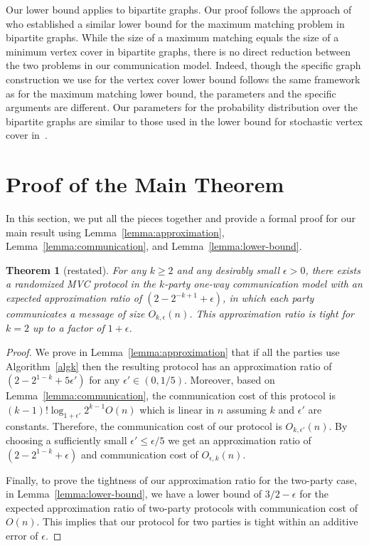 \documentclass[11pt]{article}
\newtheorem*{theorem*}{Theorem}
\begin{document}
Our lower bound
applies to bipartite graphs. Our proof follows the approach
of~\cite{DBLP:conf/soda/GoelKK12} who established a similar lower
bound for the maximum matching problem in bipartite graphs.  While the
size of a maximum matching equals the size of a minimum vertex cover
in bipartite graphs, there is no direct reduction between the two
problems in our communication model.  Indeed, though the specific
graph construction we use for the vertex cover lower bound follows the
same framework as for the maximum matching lower bound, the parameters
and the specific arguments are different.  Our parameters for the
probability distribution over the bipartite graphs are similar to
those used in the lower bound for stochastic vertex cover
in~\cite{DBLP:conf/stoc/DerakhshanDH23}. \section{Proof of the Main Theorem}
\label{sec:main}
In this section, we  put all the pieces together and provide a formal proof for our main result using Lemma~\ref{lemma:approximation}, Lemma~\ref{lemma:communication}, and Lemma~\ref{lemma:lower-bound}.
\begin{theorem*}[restated]
For any $k \geq 2$ and any desirably small $\epsilon > 0$, there exists a randomized MVC protocol in the $k$-party one-way communication model with an expected approximation ratio of $(2 - 2^{-k+1} + \epsilon)$, in which each party communicates a message of size \(O_{k, \epsilon}(n)\). This approximation ratio is tight for $k=2$ up to a factor of $1+\epsilon$.
\end{theorem*}
\begin{proof}
We prove in Lemma~\ref{lemma:approximation} that
if all the parties use Algorithm~\ref{algk} then the resulting protocol has an approximation ratio of  $(2 - 2^{1-k} + 5 \epsilon')$ for  any $\epsilon' \in (0, 1/5)$. Moreover, based on Lemma~\ref{lemma:communication}, the communication cost of this protocol is $(k-1)! \log_{1 + \epsilon'}2^{k-1} O(n)$ which is linear in $n$ assuming $k$ and $\epsilon'$ are constants. Therefore, the communication cost of our protocol is $O_{k,\epsilon'}(n)$. By choosing a sufficiently small $\epsilon'\leq \epsilon/5$ we get an approximation ratio of $(2 - 2^{1-k} + \epsilon)$ and communication cost of $O_{\epsilon, k}(n)$.
    
Finally, to prove the tightness of our approximation ratio for the two-party  case,  in Lemma~\ref{lemma:lower-bound}, we have a lower bound of $3/2 - \epsilon$ for the expected approximation ratio of two-party protocols with communication cost of $O(n)$. This implies that our protocol for two parties is tight within an additive error of  $\epsilon$.
\end{proof}
 



\end{document}
